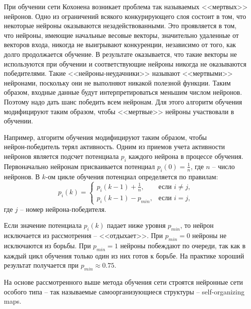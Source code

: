 \documentclass[bachelor, och, referat]{SCWorks}
\begin{document}
При обучении сети Кохонена возникает проблема так называемых
<<мертвых>> нейронов. Одно из ограничений всякого конкурирующего слоя
состоит в том, что некоторые нейроны оказываются незадействованными.
Это проявляется в том, что нейроны, имеющие начальные весовые векторы,
значительно удаленные от векторов входа, никогда не выигрывают
конкуренции, независимо от того, как долго продолжается обучение. В
результате оказывается, что такие векторы не используются при обучении и
соответствующие нейроны никогда не оказываются победителями. Такие
<<нейроны-неудачники>> называют <<мертвыми>> нейронами, поскольку они не
выполняют никакой полезной функции. Таким образом, входные данные
будут интерпретироваться меньшим числом нейронов. Поэтому надо дать
шанс победить всем нейронам. Для этого алгоритм обучения модифицируют
таким образом, чтобы <<мертвые>> нейроны участвовали в обучении. 

Например, алгоритм обучения модифицируют таким образом, чтобы
\\нейрон-победитель терял активность. Одним из приемов учета активности
нейронов является подсчет потенциала $p_i$ каждого нейрона в процессе
обучения. Первоначально нейронам присваивается потенциал
$p_i(0) = \frac{1}{n}$, где $n$ -- число нейронов. В $k$-ом цикле обучения
потенциал определяется по правилам:
\begin{equation*}
    p_i(k) = 
    \begin{cases}
        p_i(k - 1) + \frac{1}{n},  & \text{если } i \neq j,\\
        p_i(k - 1) - p_{min},  & \text{если } i = j,
    \end{cases}
\end{equation*}
где $j$ -- номер нейрона-победителя.

Если значение потенциала $p_i(k)$ падает ниже уровня $p_{min}$, то нейрон
исключается из рассмотрения -- <<отдыхает>>. При $p_{min} = 0$ нейроны не
исключаются из борьбы. При $p_{min} = 1$ нейроны побеждают по очереди, так
как в каждый цикл обучения только один из них готов к борьбе. На практике
хороший результат получается при $p_{min} \approx 0.75$.

На основе рассмотренного выше метода обучения сети строятся нейронные сети особого типа -- так
называемые самоорганизующиеся структуры -- self-organizing maps. 
\end{document}
